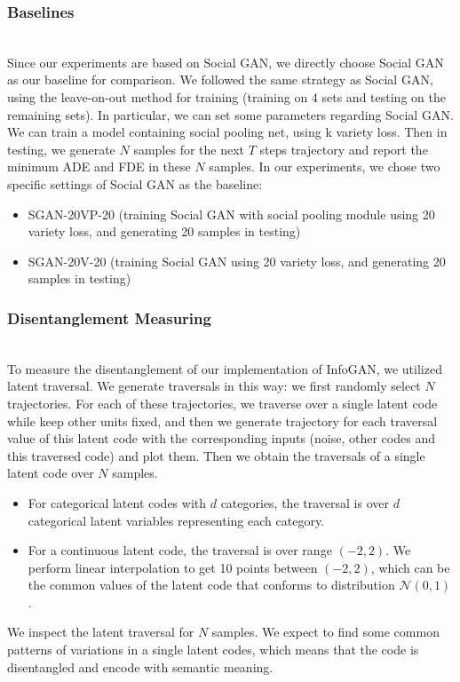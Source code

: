 \subsubsection{Baselines}
\hfill \\
Since our experiments are based on Social GAN, we directly choose Social GAN as our baseline for comparison. We followed the same strategy as Social GAN, using the leave-on-out method for training (training on 4 sets and testing on the remaining sets). In particular,  we can set some parameters regarding Social GAN. We can train a model containing social pooling net, using k variety loss. Then in testing, we generate $N$ samples for the next $T$ steps trajectory and report the minimum ADE and FDE in these $N$ samples. In our experiments, we chose two specific settings of Social GAN as the baseline:
\begin{itemize}
  \item SGAN-20VP-20 (training Social GAN with social pooling module using 20 variety loss, and generating 20 samples in testing)
  \item SGAN-20V-20 (training Social GAN using 20 variety loss, and generating 20 samples in testing)
\end{itemize}

\subsubsection{Disentanglement Measuring}
\hfill \\
To measure the disentanglement of our implementation of InfoGAN, we utilized latent traversal. We generate traversals in this way: we first randomly select $N$ trajectories. For each of these trajectories, we traverse over a single latent code while keep other units fixed, and then we generate trajectory for each traversal value of this latent code with the corresponding inputs (noise, other codes and this traversed code) and plot them. Then we obtain the traversals of a single latent code over $N$ samples.

\begin{itemize}
  \item For categorical latent codes with $d$ categories, the traversal is over $d$ categorical latent variables representing each category.
  \item For a continuous latent code, the traversal is over range $(-2, 2)$. We perform linear interpolation to get 10 points between $(-2, 2)$, which can be the common values of the latent code that conforms to distribution $\mathcal{N}(0, 1)$.
\end{itemize}

We inspect the latent traversal for $N$ samples. We expect to find some common patterns of variations in a single latent codes, which means that the code is disentangled and encode with semantic meaning.